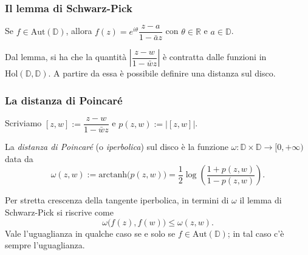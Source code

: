 \begin{frame}
  \frametitle{Il lemma di Schwarz-Pick}
  \begin{oss}
    Se $f \in \text{Aut}(\mathbb{D})$, allora $f(z)=e^{i\theta}\dfrac{z-a}{1-\bar{a}z}$ con $\theta \in \mathbb{R}$ e $a \in \mathbb{D}$.
  \end{oss}
  \pause
  Dal lemma, si ha che la quantità $\left|\dfrac{z-w}{1-\bar{w}z}\right|$ è contratta dalle funzioni in $\text{Hol}(\mathbb{D},\mathbb{D})$. A partire da essa è possibile definire una distanza sul disco.
\end{frame}

\begin{frame}
  \frametitle{La distanza di Poincaré}
  Scriviamo $[z,w]:=\dfrac{z-w}{1-\bar{w}z}$ e $p(z,w):=|[z,w]|$. \pause
  \begin{defn}
    La \textit{distanza di Poincaré} (o \textit{iperbolica}) sul disco è la funzione $\omega:\mathbb{D}\times \mathbb{D} \longrightarrow [0,+\infty)$ data da
    $$\omega(z,w):=\text{arctanh}\bigl(p(z,w)\bigr)=\frac{1}{2}\log\left(\frac{1+p(z,w)}{1-p(z,w)}\right).$$
  \end{defn}
  \pause
  Per stretta crescenza della tangente iperbolica, in termini di $\omega$ il lemma di Schwarz-Pick si riscrive come
  $$\omega\bigl(f(z),f(w)\bigr) \le \omega(z,w).$$
  Vale l'uguaglianza in qualche caso se e solo se $f \in \text{Aut}(\mathbb{D})$; in tal caso c'è sempre l'uguaglianza.
\end{frame}
